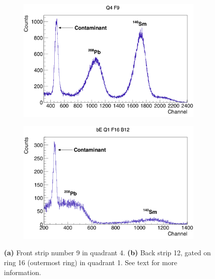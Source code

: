 \documentclass[twoside,english]{uiofysmaster/uiofysmaster}
\begin{document}
\begin{figure}[htb!]
	\centering
	\begin{subfigure}[b]{0.49\textwidth}
		\centering
		\includegraphics[width=\textwidth]{../Plots/plotting/TB_Q4_F9.png}
		\caption{}
		\label{fig:CD_cal_easy}
	\end{subfigure}
	\hfill
	\begin{subfigure}[b]{0.49\textwidth}
		\centering
		\includegraphics[width=\textwidth]{../Plots/plotting/bE_Q1_f16_b12.png}
		\caption{}
		\label{fig:CD_cal_difficult}
	\end{subfigure}
	\caption{\textbf{(a)} Front strip number 9 in quadrant 4. 
	\textbf{(b)} Back strip 12, gated on ring 16 (outermost ring) in quadrant 1. 
	See text for more information.}
	\label{fig:cal_ED}
\end{figure}
\end{document}
